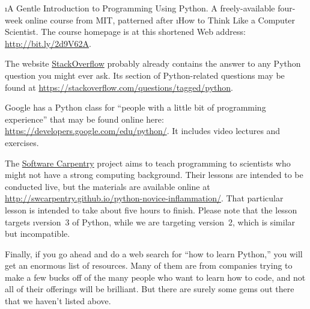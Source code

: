 \documentclass[letterpaper, 12pt, titlepage, twoside]{article}
\begin{document}
\i{A Gentle Introduction to Programming Using Python}. A freely-available
four-week online course from MIT, patterned after \i{How to Think Like a
  Computer Scientist}. The course homepage is at this shortened Web address:
\url{http://bit.ly/2d9V62A}.

The website \href{https://stackoverflow.com/}{StackOverflow} probably already
contains the answer to any Python question you might ever ask. Its section of
Python-related questions may be found at
\url{https://stackoverflow.com/questions/tagged/python}.

Google has a Python class for ``people with a little bit of programming
experience'' that may be found online here:
\url{https://developers.google.com/edu/python/}. It includes video lectures
and exercises.

The \href{https://software-carpentry.org/}{Software Carpentry} project aims to
teach programming to scientists who might not have a strong computing
background. Their lessons are intended to be conducted live, but the materials
are available online at
\url{http://swcarpentry.github.io/python-novice-inflammation/}. That
particular lesson is intended to take about five hours to finish. Please note
that the lesson targets \i{version~3} of Python, while we are targeting
version~2, which is similar but incompatible.

Finally, if you go ahead and do a web search for ``how to learn Python,'' you
will get an enormous list of resources. Many of them are from companies trying
to make a few bucks off of the many people who want to learn how to code, and
not all of their offerings will be brilliant. But there are surely some gems
out there that we haven't listed above.
\end{document}
